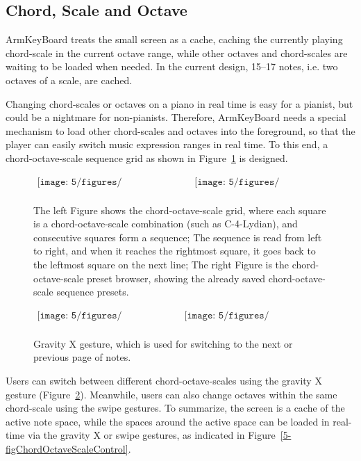 \subsection{Chord, Scale and Octave}
ArmKeyBoard treats the small screen as a cache, caching the currently playing chord-scale in the current octave range, while other octaves and chord-scales are waiting to be loaded when needed. In the current design, 15--17 notes, i.e. two octaves of a scale, are cached.

Changing chord-scales or octaves on a piano in real time is easy for a pianist, but could be a nightmare for non-pianists. Therefore, ArmKeyBoard needs a special mechanism to load other chord-scales and octaves into the foreground, so that the player can easily switch music expression ranges in real time. To this end, a chord-octave-scale sequence grid as shown in Figure~\ref{fig:5-cosgrid} is designed.
\begin{figure}[htbp]
\begin{center}$
\begin{array}{cc}
    \texttt{[image: 5/figures/ChordOctaveScaleGrid.PNG]} &
    \texttt{[image: 5/figures/ChordScalePreset.PNG]}\\
\end{array}$
\end{center}
\caption{The left Figure shows the chord-octave-scale grid, where each square is a chord-octave-scale combination (such as C-4-Lydian), and consecutive squares form a sequence; The sequence is read from left to right, and when it reaches the rightmost square, it goes back to the leftmost square on the next line; The right Figure is the chord-octave-scale preset browser, showing the already saved chord-octave-scale sequence presets.}
\label{fig:5-cosgrid}
\end{figure}

\begin{figure}[htbp]
\begin{center}$
\begin{array}{cc}
\texttt{[image: 5/figures/Gravity0.jpg]} &
\texttt{[image: 5/figures/GravityX.jpg]} \\
\end{array}$
\end{center}
\caption{Gravity X gesture, which is used for switching to the next or previous page of notes.}
\label{fig:5-GravityXGesture}
\end{figure}

Users can switch between different chord-octave-scales using the gravity X gesture (Figure~\ref{fig:5-GravityXGesture}). Meanwhile, users can also change octaves within the same chord-scale using the swipe gestures. To summarize, the screen is a cache of the active note space, while the spaces around the active space can be loaded in real-time via the gravity X or swipe gestures, as indicated in Figure~\ref{5-figChordOctaveScaleControl}.

